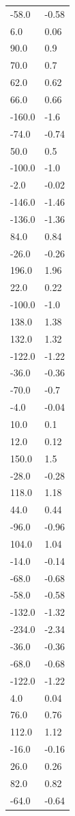 \begin{longtable}{ll}
-58.0 & -0.58 \\
6.0 & 0.06 \\
90.0 & 0.9 \\
70.0 & 0.7 \\
62.0 & 0.62 \\
66.0 & 0.66 \\
-160.0 & -1.6 \\
-74.0 & -0.74 \\
50.0 & 0.5 \\
-100.0 & -1.0 \\
-2.0 & -0.02 \\
-146.0 & -1.46 \\
-136.0 & -1.36 \\
84.0 & 0.84 \\
-26.0 & -0.26 \\
196.0 & 1.96 \\
22.0 & 0.22 \\
-100.0 & -1.0 \\
138.0 & 1.38 \\
132.0 & 1.32 \\
-122.0 & -1.22 \\
-36.0 & -0.36 \\
-70.0 & -0.7 \\
-4.0 & -0.04 \\
10.0 & 0.1 \\
12.0 & 0.12 \\
150.0 & 1.5 \\
-28.0 & -0.28 \\
118.0 & 1.18 \\
44.0 & 0.44 \\
-96.0 & -0.96 \\
104.0 & 1.04 \\
-14.0 & -0.14 \\
-68.0 & -0.68 \\
-58.0 & -0.58 \\
-132.0 & -1.32 \\
-234.0 & -2.34 \\
-36.0 & -0.36 \\
-68.0 & -0.68 \\
-122.0 & -1.22 \\
4.0 & 0.04 \\
76.0 & 0.76 \\
112.0 & 1.12 \\
-16.0 & -0.16 \\
26.0 & 0.26 \\
82.0 & 0.82 \\
-64.0 & -0.64 \\

\end{longtable}
